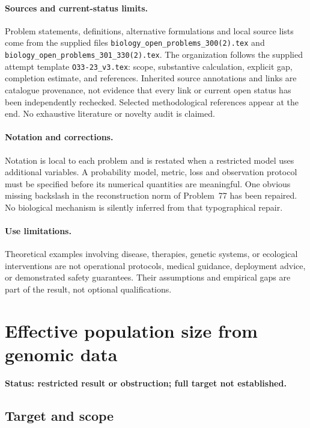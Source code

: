 \documentclass[11pt]{article}
\begin{document}
\paragraph{Sources and current-status limits.}
Problem statements, definitions, alternative formulations and local source lists
come from the supplied files
\texttt{biology\_open\_problems\_300(2).tex} and
\texttt{biology\_open\_problems\_301\_330(2).tex}.
The organization follows the supplied attempt template
\texttt{O33-23\_v3.tex}: scope, substantive calculation, explicit gap,
completion estimate, and references. Inherited source annotations and links are
catalogue provenance, not evidence that every link or current open status has
been independently rechecked. Selected methodological references appear at the
end. No exhaustive literature or novelty audit is claimed.

\paragraph{Notation and corrections.}
Notation is local to each problem and is restated when a restricted model uses
additional variables. A probability model, metric, loss and observation protocol
must be specified before its numerical quantities are meaningful. One obvious
missing backslash in the reconstruction norm of Problem~77 has been repaired.
No biological mechanism is silently inferred from that typographical repair.

\paragraph{Use limitations.}
Theoretical examples involving disease, therapies, genetic systems, or ecological
interventions are not operational protocols, medical guidance, deployment advice,
or demonstrated safety guarantees. Their assumptions and empirical gaps are part
of the result, not optional qualifications.


\section*{Effective population size from genomic data}
\label{prob:161}
\noindent\textbf{Status: restricted result or obstruction; full target not established.}
\subsection{Target and scope}
\end{document}
